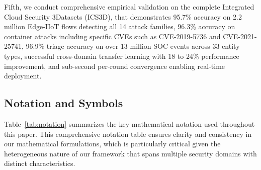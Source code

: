 \documentclass[12pt,a4paper]{article}
\theoremstyle{definition}
\begin{document}
Fifth, we conduct comprehensive empirical validation on the complete Integrated Cloud Security 3Datasets (ICS3D), that demonstrates 95.7\% accuracy on 2.2 million Edge-IIoT flows detecting all 14 attack families, 96.3\% accuracy on container attacks including specific CVEs such as CVE-2019-5736 and CVE-2021-25741, 96.9\% triage accuracy on over 13 million SOC events across 33 entity types, successful cross-domain transfer learning with 18 to 24\% performance improvement, and sub-second per-round convergence enabling real-time deployment.

\subsection{Notation and Symbols}
\label{sec:notation}

Table~\ref{tab:notation} summarizes the key mathematical notation used throughout this paper. This comprehensive notation table ensures clarity and consistency in our mathematical formulations, which is particularly critical given the heterogeneous nature of our framework that spans multiple security domains with distinct characteristics.
\end{document}
